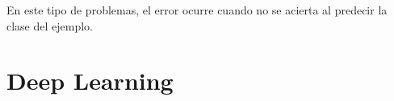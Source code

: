En este tipo de problemas, el error ocurre cuando no se acierta al predecir la clase del ejemplo.
















\section{Deep Learning}

